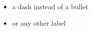 \begin{itemize}
    \item[--] a dash instead of a bullet
    \item[(a)] or any other label
\end{itemize}
